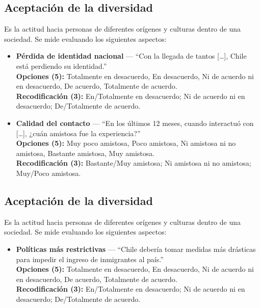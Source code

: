 \documentclass[
  spanish,
  letterpaper,
  DIV=11,
  numbers=noendperiod,
  oneside]{scrartcl}
\providecommand{\tightlist}{%
  \setlength{\itemsep}{0pt}\setlength{\parskip}{0pt}}
\begin{document}
\subsection{Aceptación de la
diversidad}\label{aceptaciuxf3n-de-la-diversidad-1}

Es la actitud hacia personas de diferentes orígenes y culturas dentro de
una sociedad. Se mide evaluando los siguientes aspectos:

\begin{itemize}
\item
  \textbf{Pérdida de identidad nacional} --- ``Con la llegada de tantos
  {[}\ldots{]}, Chile está perdiendo su identidad.''\\
  \textbf{Opciones (5):} Totalmente en desacuerdo, En desacuerdo, Ni de
  acuerdo ni en desacuerdo, De acuerdo, Totalmente de acuerdo.\\
  \textbf{Recodificación (3):} En/Totalmente en desacuerdo; Ni de
  acuerdo ni en desacuerdo; De/Totalmente de acuerdo.
\item
  \textbf{Calidad del contacto} --- ``En los últimos 12 meses, cuando
  interactuó con {[}\ldots{]}, ¿cuán amistosa fue la experiencia?''\\
  \textbf{Opciones (5):} Muy poco amistosa, Poco amistosa, Ni amistosa
  ni no amistosa, Bastante amistosa, Muy amistosa.\\
  \textbf{Recodificación (3):} Bastante/Muy amistosa; Ni amistosa ni no
  amistosa; Muy/Poco amistosa.
\end{itemize}

\subsection{Aceptación de la
diversidad}\label{aceptaciuxf3n-de-la-diversidad-2}

Es la actitud hacia personas de diferentes orígenes y culturas dentro de
una sociedad. Se mide evaluando los siguientes aspectos:

\begin{itemize}
\tightlist
\item
  \textbf{Políticas más restrictivas} --- ``Chile debería tomar medidas
  más drásticas para impedir el ingreso de inmigrantes al país.''\\
  \textbf{Opciones (5):} Totalmente en desacuerdo, En desacuerdo, Ni de
  acuerdo ni en desacuerdo, De acuerdo, Totalmente de acuerdo.\\
  \textbf{Recodificación (3):} En/Totalmente en desacuerdo; Ni de
  acuerdo ni en desacuerdo; De/Totalmente de acuerdo.
\end{itemize}
\end{document}
